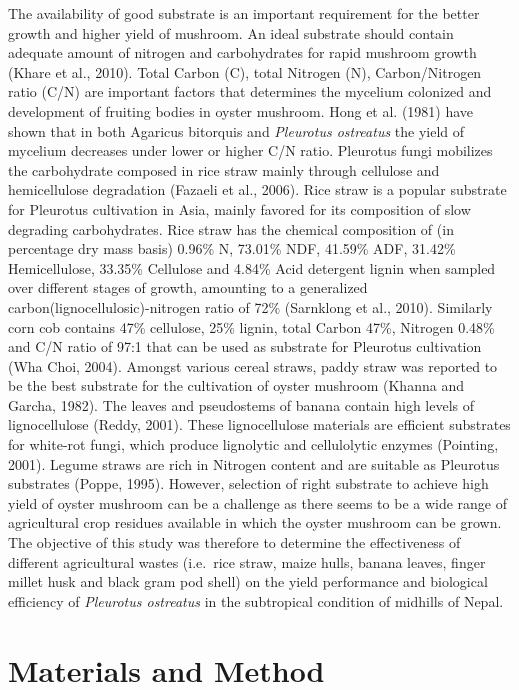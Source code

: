 \documentclass[]{elsarticle} %
\begin{document}
The availability of good substrate is an important requirement for the
better growth and higher yield of mushroom. An ideal substrate should
contain adequate amount of nitrogen and carbohydrates for rapid mushroom
growth (Khare et al., 2010). Total Carbon (C), total Nitrogen (N),
Carbon/Nitrogen ratio (C/N) are important factors that determines the
mycelium colonized and development of fruiting bodies in oyster
mushroom. Hong et al. (1981) have shown that in both Agaricus bitorquis
and \textit{Pleurotus ostreatus} the yield of mycelium decreases under
lower or higher C/N ratio. Pleurotus fungi mobilizes the carbohydrate
composed in rice straw mainly through cellulose and hemicellulose
degradation (Fazaeli et al., 2006). Rice straw is a popular substrate
for Pleurotus cultivation in Asia, mainly favored for its composition of
slow degrading carbohydrates. Rice straw has the chemical composition of
(in percentage dry mass basis) 0.96\% N, 73.01\% NDF, 41.59\% ADF,
31.42\% Hemicellulose, 33.35\% Cellulose and 4.84\% Acid detergent
lignin when sampled over different stages of growth, amounting to a
generalized carbon(lignocellulosic)-nitrogen ratio of 72\% (Sarnklong et
al., 2010). Similarly corn cob contains 47\% cellulose, 25\% lignin,
total Carbon 47\%, Nitrogen 0.48\% and C/N ratio of 97:1 that can be
used as substrate for Pleurotus cultivation (Wha Choi, 2004). Amongst
various cereal straws, paddy straw was reported to be the best substrate
for the cultivation of oyster mushroom (Khanna and Garcha, 1982). The
leaves and pseudostems of banana contain high levels of lignocellulose
(Reddy, 2001). These lignocellulose materials are efficient substrates
for white-rot fungi, which produce lignolytic and cellulolytic enzymes
(Pointing, 2001). Legume straws are rich in Nitrogen content and are
suitable as Pleurotus substrates (Poppe, 1995). However, selection of
right substrate to achieve high yield of oyster mushroom can be a
challenge as there seems to be a wide range of agricultural crop
residues available in which the oyster mushroom can be grown. The
objective of this study was therefore to determine the effectiveness of
different agricultural wastes (i.e.~rice straw, maize hulls, banana
leaves, finger millet husk and black gram pod shell) on the yield
performance and biological efficiency of \textit{Pleurotus ostreatus} in
the subtropical condition of midhills of Nepal.

\hypertarget{materials-and-method}{%
\section{Materials and Method}\label{materials-and-method}}
\end{document}
